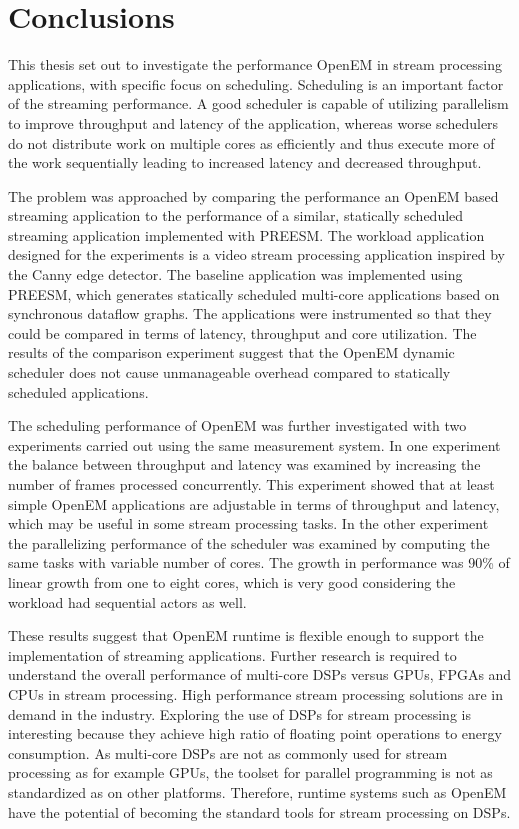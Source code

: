 \chapter{Conclusions}
\label{chapter:conclusion}
This thesis set out to investigate the performance OpenEM in stream processing applications, with specific focus on scheduling. Scheduling is an important factor of the streaming performance. A good scheduler is capable of utilizing parallelism to improve throughput and latency of the application, whereas worse schedulers do not distribute work on multiple cores as efficiently and thus execute more of the work sequentially leading to increased latency and decreased throughput.

The problem was approached by comparing the performance an OpenEM based streaming application to the performance of a similar, statically scheduled streaming application implemented with PREESM. The workload application designed for the experiments is a video stream processing application inspired by the Canny edge detector. The baseline application was implemented using PREESM, which generates statically scheduled multi-core applications based on synchronous dataflow graphs. The applications were instrumented so that they could be compared in terms of latency, throughput and core utilization. The results of the comparison experiment suggest that the OpenEM dynamic scheduler does not cause unmanageable overhead compared to statically scheduled applications.

The scheduling performance of OpenEM was further investigated with two experiments carried out using the same measurement system. In one experiment the balance between throughput and latency was examined by increasing the number of frames processed concurrently. This experiment showed that at least simple OpenEM applications are adjustable in terms of throughput and latency, which may be useful in some stream processing tasks. In the other experiment the parallelizing performance of the scheduler was examined by computing the same tasks with variable number of cores. The growth in performance was 90\% of linear growth from one to eight cores, which is very good considering the workload had sequential actors as well.

These results suggest that OpenEM runtime is flexible enough to support the implementation of streaming applications. Further research is required to understand the overall performance of multi-core DSPs versus GPUs, FPGAs and CPUs in stream processing. High performance stream processing solutions are in demand in the industry. Exploring the use of DSPs for stream processing is interesting because they achieve high ratio of floating point operations to energy consumption. As multi-core DSPs are not as commonly used for stream processing as for example GPUs, the toolset for parallel programming is not as standardized as on other platforms. Therefore, runtime systems such as OpenEM have the potential of becoming the standard tools for stream processing on DSPs.
